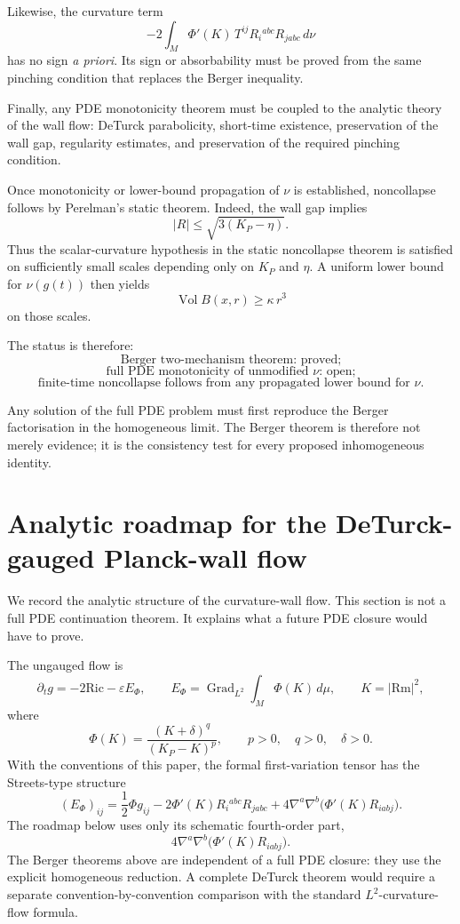 \documentclass[11pt]{amsart}
\newcommand{\Rm}{\mathrm{Rm}}
\newcommand{\Ric}{\mathrm{Ric}}
\newcommand{\KP}{K_{\!P}}
\newcommand{\Grad}{\operatorname{Grad}}
\begin{document}
Likewise, the curvature term
\[
-2\int_M\Phi'(K)\,T^{ij}R_i{}^{abc}R_{jabc}\,d\nu
\]
has no sign \emph{a priori}.  Its sign or absorbability must be proved from
the same pinching condition that replaces the Berger inequality.

Finally, any PDE monotonicity theorem must be coupled to the analytic theory
of the wall flow: DeTurck parabolicity, short-time existence, preservation of
the wall gap, regularity estimates, and preservation of the required pinching
condition.

Once monotonicity or lower-bound propagation of \(\nu\) is established,
noncollapse follows by Perelman's static theorem.  Indeed, the wall gap
implies
\[
|R|\le \sqrt{3(\KP-\eta)}.
\]
Thus the scalar-curvature hypothesis in the static noncollapse theorem is
satisfied on sufficiently small scales depending only on \(\KP\) and \(\eta\).
A uniform lower bound for \(\nu(g(t))\) then yields
\[
\operatorname{Vol}B(x,r)\ge \kappa\, r^3
\]
on those scales.

The status is therefore:
\[
\boxed{\text{Berger two-mechanism theorem: proved;}}
\]
\[
\boxed{\text{full PDE monotonicity of unmodified \(\nu\): open;}}
\]
\[
\boxed{\text{finite-time noncollapse follows from any propagated lower bound for \(\nu\).}}
\]

Any solution of the full PDE problem must first reproduce the Berger
factorisation in the homogeneous limit.  The Berger theorem is therefore not
merely evidence; it is the consistency test for every proposed inhomogeneous
identity.



\section{Analytic roadmap for the DeTurck-gauged Planck-wall flow}

We record the analytic structure of the curvature-wall flow.  This section is
not a full PDE continuation theorem.  It explains what a future PDE closure
would have to prove.

The ungauged flow is
\[
\partial_t g
=
-2\Ric
-
\varepsilon E_\Phi,
\qquad
E_\Phi
=
\Grad_{L^2}\int_M\Phi(K)\,d\mu,
\qquad
K=|\Rm|^2,
\]
where
\[
\Phi(K)
=
\frac{(K+\delta)^q}{(\KP-K)^p},
\qquad
p>0,\quad q>0,\quad \delta>0 .
\]
With the conventions of this paper, the formal first-variation tensor has
the Streets-type structure
\[
(E_\Phi)_{ij}
=
\frac12\Phi g_{ij}
-
2\Phi'(K)R_i{}^{abc}R_{jabc}
+
4\nabla^a\nabla^b\bigl(\Phi'(K)R_{iabj}\bigr).
\]
The roadmap below uses only its schematic fourth-order part,
\[
4\nabla^a\nabla^b\bigl(\Phi'(K)R_{iabj}\bigr).
\]
The Berger theorems above are independent of a full PDE closure: they use the
explicit homogeneous reduction.  A complete DeTurck theorem would require a
separate convention-by-convention comparison with the standard
\(L^2\)-curvature-flow formula.
\end{document}
